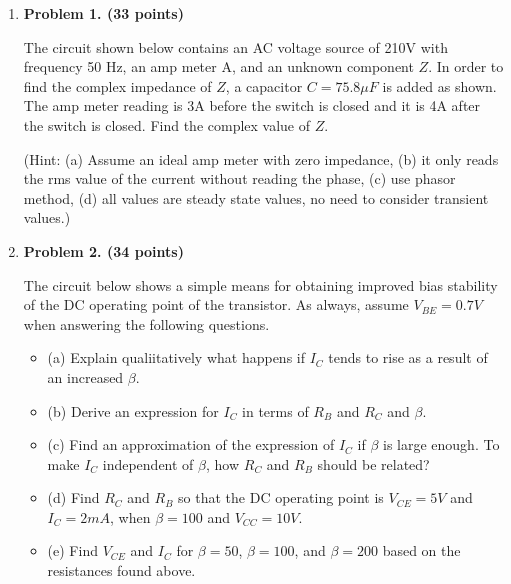 \begin{enumerate}

\item {\bf Problem 1. (33 points)} 

The circuit shown below contains an AC voltage source of 210V with frequency
50 Hz, an amp meter A, and an unknown component $Z$. In order to find the 
complex impedance of $Z$, a capacitor $C=75.8\mu F$ is added as shown. The 
amp meter reading is 3A before the switch is closed and it is 4A after the
switch is closed. Find the complex value of $Z$.

(Hint: (a) Assume an ideal amp meter with zero impedance, (b) it only reads 
the rms value of the current without reading the phase, (c) use phasor method,
(d) all values are steady state values, no need to consider transient values.)





%
%
%

\item {\bf Problem 2. (34 points)} 

The circuit below shows a simple means for obtaining improved bias
stability of the DC operating point of the transistor. As always,
assume $V_{BE}=0.7V$ when answering the following questions.


\begin{itemize}
\item (a) Explain qualiitatively what happens if $I_C$ tends to rise as a
result of an increased $\beta$.
\item (b) Derive an expression for $I_C$ in terms of $R_B$ and $R_C$ and
$\beta$.
\item (c) Find an approximation of the expression of $I_C$ if $\beta$ is 
large enough. To make $I_C$ independent of $\beta$, how $R_C$ and
$R_B$ should be related?
\item (d) Find $R_C$ and $R_B$ so that the DC operating point is $V_{CE}=5V$ 
and $I_C=2mA$, when $\beta=100$ and $V_{CC}=10V$.
\item (e) Find $V_{CE}$ and $I_C$ for $\beta=50$, $\beta=100$, and $\beta=200$
	based on the resistances found above.
\end{itemize}


\end{enumerate}
